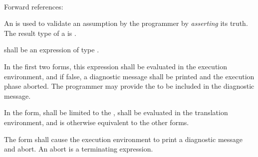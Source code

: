 \begin{grammar}
 \\
	 \terminal{(}  \terminal{)} \\
	 \terminal{(}  \terminal{,}  \terminal{)} \\
	  \terminal{(}  \terminal{)} \\
	  \terminal{(}  \terminal{,}  \terminal{)} \\
	 \terminal{(} \terminal{)} \\
\end{grammar}

Forward references: 

\specsubsubitem
An  is used to validate an assumption by the
programmer by \textit{asserting} its truth. The result type of a
 is .

\specsubsubitem
{} shall be an expression of type
.

\specsubsubitem
In the first two forms, this expression shall be evaluated
in the execution environment, and if false, a diagnostic message shall be
printed and the execution phase aborted. The programmer may provide the
 to be included in the diagnostic message.

\specsubsubitem
In the  form,  shall be limited
to the , shall be evaluated
in the translation environment, and is otherwise equivalent to the other forms.

\specsubsubitem
The  form shall cause the execution environment to print a
diagnostic message and abort. An abort is a terminating expression.


